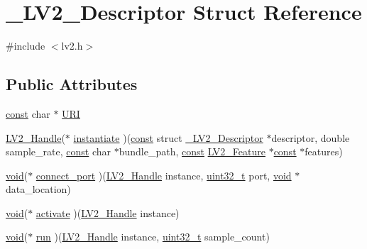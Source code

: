 \hypertarget{struct___l_v2___descriptor}{}\section{\+\_\+\+L\+V2\+\_\+\+Descriptor Struct Reference}
\label{struct___l_v2___descriptor}


{\ttfamily \#include $<$lv2.\+h$>$}

\subsection*{Public Attributes}
\begin{DoxyCompactItemize}
\item 
\hyperlink{getopt1_8c_a2c212835823e3c54a8ab6d95c652660e}{const} char $\ast$ \hyperlink{struct___l_v2___descriptor_a4d26065676fcaaf06ba1fb242de0fc72}{U\+RI}
\item 
\hyperlink{lv2_8h_a95eafb0a5290f30bcdc8c0f8eb992eaf}{L\+V2\+\_\+\+Handle}($\ast$ \hyperlink{struct___l_v2___descriptor_a2f7e1c335ddf27d3a0017207421fe9f5}{instantiate} )(\hyperlink{getopt1_8c_a2c212835823e3c54a8ab6d95c652660e}{const} struct \hyperlink{struct___l_v2___descriptor}{\+\_\+\+L\+V2\+\_\+\+Descriptor} $\ast$descriptor, double sample\+\_\+rate, \hyperlink{getopt1_8c_a2c212835823e3c54a8ab6d95c652660e}{const} char $\ast$bundle\+\_\+path, \hyperlink{getopt1_8c_a2c212835823e3c54a8ab6d95c652660e}{const} \hyperlink{lv2_8h_a78d13b607443404459db283371723234}{L\+V2\+\_\+\+Feature} $\ast$\hyperlink{getopt1_8c_a2c212835823e3c54a8ab6d95c652660e}{const} $\ast$features)
\item 
\hyperlink{sound_8c_ae35f5844602719cf66324f4de2a658b3}{void}($\ast$ \hyperlink{struct___l_v2___descriptor_a7c6a66b45322444b14e6d0fc27da62d5}{connect\+\_\+port} )(\hyperlink{lv2_8h_a95eafb0a5290f30bcdc8c0f8eb992eaf}{L\+V2\+\_\+\+Handle} instance, \hyperlink{lib-src_2ffmpeg_2win32_2stdint_8h_a6eb1e68cc391dd753bc8ce896dbb8315}{uint32\+\_\+t} port, \hyperlink{sound_8c_ae35f5844602719cf66324f4de2a658b3}{void} $\ast$data\+\_\+location)
\item 
\hyperlink{sound_8c_ae35f5844602719cf66324f4de2a658b3}{void}($\ast$ \hyperlink{struct___l_v2___descriptor_ad6bfac334042df6d51f4f0f7c0a72241}{activate} )(\hyperlink{lv2_8h_a95eafb0a5290f30bcdc8c0f8eb992eaf}{L\+V2\+\_\+\+Handle} instance)
\item 
\hyperlink{sound_8c_ae35f5844602719cf66324f4de2a658b3}{void}($\ast$ \hyperlink{struct___l_v2___descriptor_ab137135b8024e88d5de9d252534f2b9b}{run} )(\hyperlink{lv2_8h_a95eafb0a5290f30bcdc8c0f8eb992eaf}{L\+V2\+\_\+\+Handle} instance, \hyperlink{lib-src_2ffmpeg_2win32_2stdint_8h_a6eb1e68cc391dd753bc8ce896dbb8315}{uint32\+\_\+t} sample\+\_\+count)

\end{DoxyCompactItemize}
